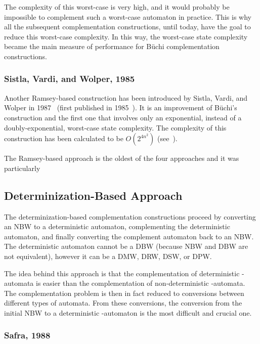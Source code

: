 The complexity of this worst-case is very high, and it would probably be impossible to complement such a worst-case automaton in practice. This is why all the subsequent complementation constructions, until today, have the goal to reduce this worst-case complexity. In this way, the worst-case state complexity became the main measure of performance for Büchi complementation constructions.

\subsubsection{Sistla, Vardi, and Wolper, 1985}

Another Ramsey-based construction has been introduced by Sistla, Vardi, and Wolper in 1987~\cite{PrasadSistla1987217} (first published in 1985~\cite{1985_sistla}). It is an improvement of Büchi's construction and the first one that involves only an exponential, instead of a doubly-exponential, worst-case state complexity. The complexity of this construction has been calculated to be $O\left(2^{4n^2}\right)$ (see~\cite{1988_safra_2}\cite{Pecuchet198695}).

The Ramsey-based approach is the oldest of the four approaches and it was particularly 


\subsection{Determinization-Based Approach}
\label{2_determinisation-based}
The determinization-based complementation constructions proceed by converting an NBW to a deterministic automaton, complementing the deterministic automaton, and finally converting the complement automaton back to an NBW. The deterministic automaton cannot be a DBW (because NBW and DBW are not equivalent), however it can be a DMW, DRW, DSW, or DPW.

The idea behind this approach is that the complementation of deterministic \om-automata is easier than the complementation of non-deterministic \om-automata. The complementation problem is then in fact reduced to conversions between different types of automata. From these conversions, the conversion from the initial NBW to a deterministic \om-automaton is the most difficult and crucial one.

\subsubsection{Safra, 1988}

